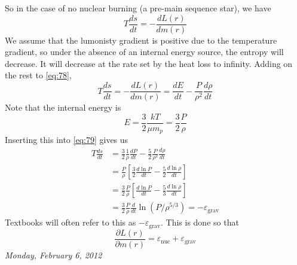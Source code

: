 \documentclass[10pt]{article}
\numberwithin{equation}{section}
\begin{document}
  So in the case of no nuclear burning (a pre-main sequence star), we
  have
  \begin{equation}
    \label{eq:78}
    T\frac{ds}{dt}=-\frac{d L(r)}{dm(r)}
  \end{equation}
  We assume that the lumonisty gradient is positive due to the
  temperature gradient, so under the absence of an internal energy
  source, the entropy will decrease. It will decrease at the rate set
  by the heat loss to infinity. Adding on the rest to \eqref{eq:78},
  \begin{equation}
    \label{eq:79}
    T\frac{ds}{dt}=-\frac{d L(r)}{dm(r)}=\frac{dE}{dt}-\frac{P}{\rho^2}\frac{d\rho}{dt}
  \end{equation}
  Note that the internal energy is
  \begin{equation}
    \label{eq:79a}
    E=\frac{3}{2}\frac{kT}{\mu m_p}=\frac{3}{2}\frac{P}{\rho}
  \end{equation}
  Inserting this into \eqref{eq:79} gives us
  \begin{align}
    \label{eq:5}
    T\frac{ds}{dt} &=
    \frac{3}{2}\frac{1}{\rho}\frac{dP}{dt}-\frac{5}{2}\frac{P}{\rho^2}\frac{d\rho}{dt}\\
    \label{eq:5a}
    &= \frac{P}{\rho}\left[\frac{3}{2}\frac{d\ln
        P}{dt}-\frac{5}{2}\frac{d\ln \rho}{dt}\right]\\
    \label{eq:5b}
    &= \frac{3}{2}\frac{P}{\rho}\left[\frac{d\ln
        P}{dt}-\frac{5}{3}\frac{d\ln\rho}{dt}\right]\\
    \label{eq:5c}
    &=\frac{3}{2}\frac{P}{\rho}\frac{d}{dt}\ln \left(
      P/\rho^{5/3}\right)=-\varepsilon_{\mathrm{grav}}
  \end{align}
  Textbooks will often refer to this as
  $-\varepsilon_{\mathrm{grav}}$. This is done so that
  \begin{equation}
    \label{eq:6}
    \frac{\partial L(r)}{\partial
      m(r)}=\varepsilon_{\mathrm{nuc}}+\varepsilon_{\mathrm{grav}}
  \end{equation}
  \textit{Monday, February 6, 2012}\\
\end{document}

